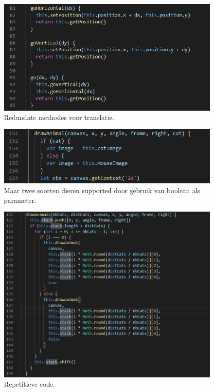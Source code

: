 \documentclass[a4paper,11pt]{article}
\begin{document}
\begin{figure}
	\centering
	\includegraphics{img/go.png}
	\caption{Redundate methodes voor translatie.}
	\label{go}
\end{figure}

\begin{figure}
	\centering
	\includegraphics{img/animals.png}
	\caption{Maar twee soorten dieren supported door gebruik van boolean als parameter.}
	\label{boolAnimal}
\end{figure}

\begin{figure}
	\centering
	\includegraphics{img/repetitive.png}
	\caption{Repetitieve code.}
	\label{repetitive}
\end{figure}
\end{document}
